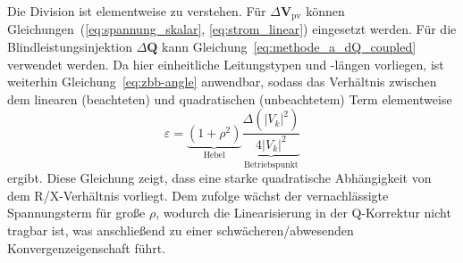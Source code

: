 
Die Division ist elementweise zu verstehen. 
Für $\Delta \mathbf{V}_\mathrm{pv}$ können Gleichungen~(\ref{eq:spannung_skalar}, \ref{eq:strom_linear}) eingesetzt werden. 
Für die Blindleistungsinjektion $\Delta\mathbf{Q}$ kann Gleichung~\eqref{eq:methode_a_dQ_coupled} verwendet werden.
Da hier einheitliche Leitungstypen und -längen vorliegen, ist weiterhin Gleichung~\eqref{eq:zbb-angle}
anwendbar, sodass das Verhältnis zwischen dem linearen (beachteten) und quadratischen (unbeachtetem) Term  elementweise
\begin{equation}
		\varepsilon
		=
		\underbrace{(1+\rho^2)}_{\text{Hebel}}
		\underbrace{\frac{\Delta(|V_k|^2)}{4|V_k|^2}}_{\text{Betriebspunkt}}
		\label{eq:lin-error-scaling}
\end{equation}
ergibt.
Diese Gleichung zeigt, dass eine starke quadratische Abhängigkeit von dem R/X-Verhältnis vorliegt.
Dem zufolge wächst der vernachlässigte Spannungsterm für große $\rho$, wodurch die Linearisierung in der Q-Korrektur nicht tragbar ist, was anschließend zu einer schwächeren/abwesenden Konvergenzeigenschaft führt.\\

